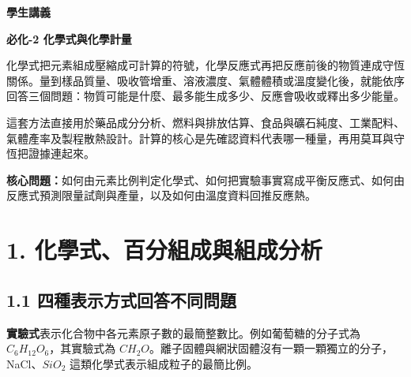 \documentclass[11pt,a4paper]{article}
\begin{document}
\begin{tcolorbox}[
  enhanced,colback=white,colframe=HandoutBlue,boxrule=1.1pt,arc=2mm,
  borderline west={3pt}{0pt}{HandoutBlue},left=5mm,right=4mm,top=4mm,bottom=4mm
]
{\sffamily\small\bfseries\color{HandoutBlue}學生講義}\par
{\sffamily\bfseries\LARGE\color{HandoutInk}必化-2 化學式與化學計量}\par
\vspace{0.35em}{\large 從組成證據寫出化學式，再用守恆、莫耳與能量帳預測反應結果}\par
{}\par
{}\par
\end{tcolorbox}


化學式把元素組成壓縮成可計算的符號，化學反應式再把反應前後的物質連成守恆關係。量到樣品質量、吸收管增重、溶液濃度、氣體體積或溫度變化後，就能依序回答三個問題：物質可能是什麼、最多能生成多少、反應會吸收或釋出多少能量。

這套方法直接用於藥品成分分析、燃料與排放估算、食品與礦石純度、工業配料、氣體產率及製程散熱設計。計算的核心是先確認資料代表哪一種量，再用莫耳與守恆把證據連起來。

\textbf{核心問題：}如何由元素比例判定化學式、如何把實驗事實寫成平衡反應式、如何由反應式預測限量試劑與產量，以及如何由溫度資料回推反應熱。

\section{1. 化學式、百分組成與組成分析}\label{ux5316ux5b78ux5f0fux767eux5206ux7d44ux6210ux8207ux7d44ux6210ux5206ux6790}

\subsection{1.1 四種表示方式回答不同問題}\label{ux56dbux7a2eux8868ux793aux65b9ux5f0fux56deux7b54ux4e0dux540cux554fux984c}

\textbf{實驗式}表示化合物中各元素原子數的最簡整數比。例如葡萄糖的分子式為 \(C_6H_{12}O_6\)，其實驗式為 \(CH_2O\)。離子固體與網狀固體沒有一顆一顆獨立的分子，NaCl、\(SiO_2\) 這類化學式表示組成粒子的最簡比例。
\end{document}
